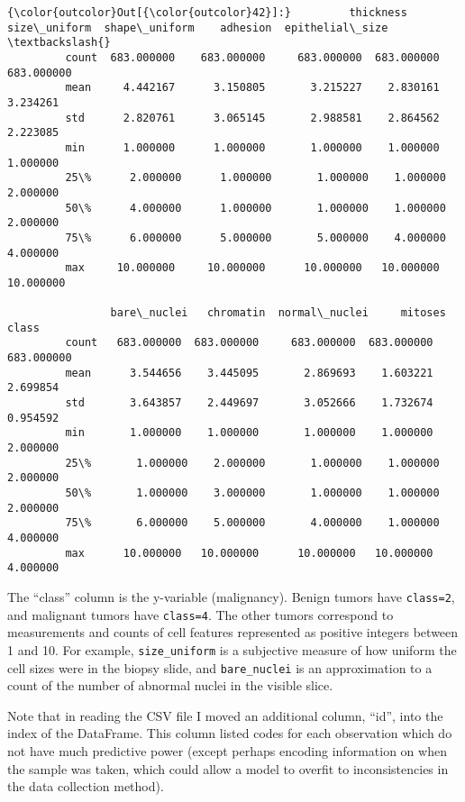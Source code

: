 \documentclass[11pt]{article}
\begin{document}
\begin{Verbatim}[commandchars=\\\{\}]
{\color{outcolor}Out[{\color{outcolor}42}]:}         thickness  size\_uniform  shape\_uniform    adhesion  epithelial\_size  \textbackslash{}
         count  683.000000    683.000000     683.000000  683.000000       683.000000   
         mean     4.442167      3.150805       3.215227    2.830161         3.234261   
         std      2.820761      3.065145       2.988581    2.864562         2.223085   
         min      1.000000      1.000000       1.000000    1.000000         1.000000   
         25\%      2.000000      1.000000       1.000000    1.000000         2.000000   
         50\%      4.000000      1.000000       1.000000    1.000000         2.000000   
         75\%      6.000000      5.000000       5.000000    4.000000         4.000000   
         max     10.000000     10.000000      10.000000   10.000000        10.000000   
         
                bare\_nuclei   chromatin  normal\_nuclei     mitoses       class  
         count   683.000000  683.000000     683.000000  683.000000  683.000000  
         mean      3.544656    3.445095       2.869693    1.603221    2.699854  
         std       3.643857    2.449697       3.052666    1.732674    0.954592  
         min       1.000000    1.000000       1.000000    1.000000    2.000000  
         25\%       1.000000    2.000000       1.000000    1.000000    2.000000  
         50\%       1.000000    3.000000       1.000000    1.000000    2.000000  
         75\%       6.000000    5.000000       4.000000    1.000000    4.000000  
         max      10.000000   10.000000      10.000000   10.000000    4.000000  
\end{Verbatim}

    The ``class'' column is the y-variable (malignancy). Benign tumors have \texttt{class=2}, and malignant tumors have \texttt{class=4}. The other tumors correspond to measurements and counts of cell features represented as positive integers between 1 and 10. For example, \texttt{size\_uniform} is a subjective measure of how uniform the cell sizes were in the biopsy slide, and \texttt{bare\_nuclei} is an approximation to a count of the number of abnormal nuclei in the visible slice.

    Note that in reading the CSV file I moved an additional column, ``id'', into the index of the DataFrame. This column listed codes for each observation which do not have much predictive power (except perhaps encoding information on when the sample was taken, which could allow a model to overfit to inconsistencies in the data collection method).
\end{document}
